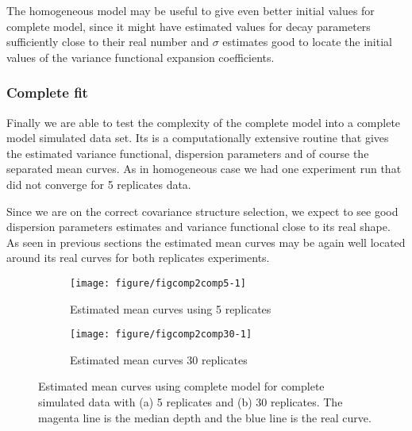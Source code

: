 The homogeneous model may be useful to give even better initial values for complete model, since it might have estimated values for decay parameters sufficiently close to their real number and $\sigma$ estimates good to locate the initial values of the variance functional expansion coefficients.


\subsubsection{Complete fit}
\label{sec:comp2comp}




Finally we are able to test the complexity of the complete model into a complete model simulated data set. Its is a computationally extensive routine that gives the estimated variance functional, dispersion parameters and of course the separated mean curves. As in homogeneous case we had one experiment run that  did not converge for 5 replicates data.

Since we are on the correct covariance structure selection, we expect to see good dispersion parameters estimates and variance functional close to its real shape. As seen in previous sections the estimated mean curves may be again well located  around its real curves for both replicates experiments.


\begin{figure}[!t]
  \centering
  \begin{subfigure}{\textwidth}
    \centering
\begin{knitrout}
\color{fgcolor}
\texttt{[image: figure/figcomp2comp5-1]} 

\end{knitrout}
    \caption{Estimated mean curves using 5 replicates}
  \end{subfigure}
  \begin{subfigure}{\textwidth}
    \centering
\begin{knitrout}
\color{fgcolor}
\texttt{[image: figure/figcomp2comp30-1]} 

\end{knitrout}
    \caption{Estimated mean curves 30 replicates}
  \end{subfigure}
  \caption{Estimated mean curves using complete model for complete simulated data with (a) 5 replicates and (b) 30 replicates. The magenta line is the median depth and the blue line is the real curve.}
  \label{fig:mpc-comp2comp}
\end{figure}

